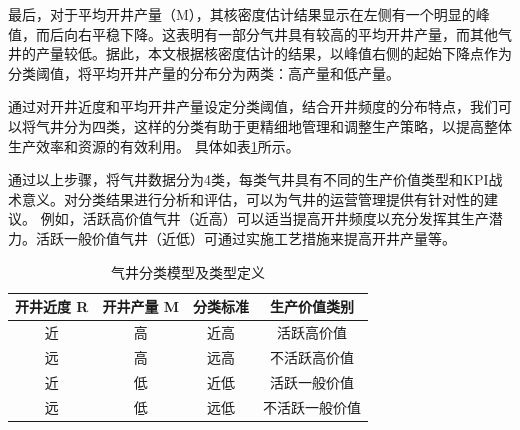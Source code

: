 最后，对于平均开井产量（M），其核密度估计结果显示在左侧有一个明显的峰值，而后向右平稳下降。这表明有一部分气井具有较高的平均开井产量，而其他气井的产量较低。据此，本文根据核密度估计的结果，以峰值右侧的起始下降点作为分类阈值，将平均开井产量的分布分为两类：高产量和低产量。

通过对开井近度和平均开井产量设定分类阈值，结合开井频度的分布特点，我们可以将气井分为四类，这样的分类有助于更精细地管理和调整生产策略，以提高整体生产效率和资源的有效利用。
具体如表\ref{table:KDE}所示。

通过以上步骤，将气井数据分为4类，每类气井具有不同的生产价值类型和KPI战术意义。对分类结果进行分析和评估，可以为气井的运营管理提供有针对性的建议。
例如，活跃高价值气井（近高）可以适当提高开井频度以充分发挥其生产潜力。活跃一般价值气井（近低）可通过实施工艺措施来提高开井产量等。
\begin{table}[H]
    \renewcommand{\arraystretch}{1.5}
    \centering
    \caption{气井分类模型及类型定义}
    \begin{tabular}{|c|c|c|c|}
    \hline
    开井近度 R  & 开井产量 M & 分类标准       & 生产价值类别   \\ \hline
    近         & 高        & 近高          & 活跃高价值 \\ \hline
    远         & 高        & 远高          & 不活跃高价值 \\ \hline
    近         & 低        & 近低          & 活跃一般价值 \\ \hline
    远         & 低        & 远低          & 不活跃一般价值 \\ \hline
    \end{tabular}
    \label{table:KDE}
\end{table}

    